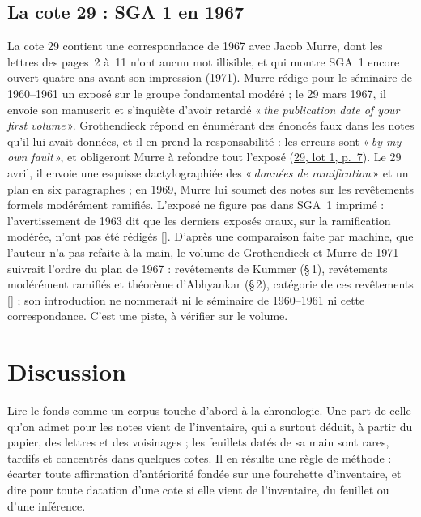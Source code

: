 \documentclass[11pt]{amsart}
\makeatletter
\newcommand{\q}[1]{«\,\textit{#1}\,»}
\def\RHM@first#1--#2\@nil{#1}
\DeclareRobustCommand{\lot}[3]{\begingroup\edef\RHM@pdfpage{\the\numexpr\RHM@first#3--\@nil+1\relax}\href{https://grothendieck.umontpellier.fr/#1.pdf\#page=\RHM@pdfpage}{#1, lot #2, p.~#3}\endgroup}
\newcommand{\lot}[3]{\href{https://grothendieck.commutator.io/\##1/#2/p#3}{#1, lot #2, p.~#3}}
\makeatother
\begin{document}
\subsection{La cote 29 : SGA 1 en 1967}\label{sub:c29}

La cote 29 contient une correspondance de 1967 avec Jacob Murre, dont les lettres des pages~2 à~11 n'ont aucun mot illisible, et qui montre SGA~1 encore ouvert quatre ans avant son impression (1971). Murre rédige pour le séminaire de 1960--1961 un exposé sur le groupe fondamental modéré ; le 29 mars 1967, il envoie son manuscrit et s'inquiète d'avoir retardé \q{the publication date of your first volume}. Grothendieck répond en énumérant des énoncés faux dans les notes qu'il lui avait données, et il en prend la responsabilité : les erreurs sont \q{by my own fault}, et obligeront Murre à refondre tout l'exposé (\lot{29}{1}{7}). Le 29 avril, il envoie une esquisse dactylographiée des \q{données de ramification} et un plan en six paragraphes ; en 1969, Murre lui soumet des notes sur les revêtements formels modérément ramifiés. L'exposé ne figure pas dans SGA~1 imprimé : l'avertissement de 1963 dit que les derniers exposés oraux, sur la ramification modérée, n'ont pas été rédigés [\citealp{sga1}]. D'après une comparaison faite par machine, que l'auteur n'a pas refaite à la main, le volume de Grothendieck et Murre de 1971 suivrait l'ordre du plan de 1967 : revêtements de Kummer (§\,1), revêtements modérément ramifiés et théorème d'Abhyankar (§\,2), catégorie de ces revêtements [\citealp{grothendieckmurre1971}] ; son introduction ne nommerait ni le séminaire de 1960--1961 ni cette correspondance. C'est une piste, à vérifier sur le volume.

\section{Discussion}\label{sec:discussion}

Lire le fonds comme un corpus touche d'abord à la chronologie. Une part de celle qu'on admet pour les notes vient de l'inventaire, qui a surtout déduit, à partir du papier, des lettres et des voisinages ; les feuillets datés de sa main sont rares, tardifs et concentrés dans quelques cotes. Il en résulte une règle de méthode : écarter toute affirmation d'antériorité fondée sur une fourchette d'inventaire, et dire pour toute datation d'une cote si elle vient de l'inventaire, du feuillet ou d'une inférence.
\end{document}
